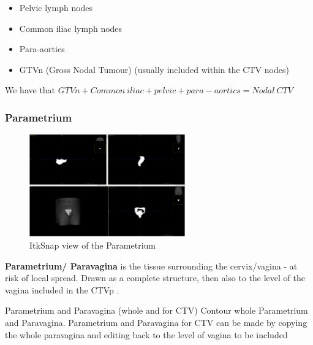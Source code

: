 \documentclass[11pt]{article}
\begin{document}
\begin{itemize}
    \item Pelvic lymph nodes
    \item Common iliac lymph nodes
    \item Para-aortics
    \item GTVn (Gross Nodal Tumour) (usually included within the CTV nodes)
\end{itemize}

We have that $GTVn + Common\ iliac + pelvic + para-aortics = Nodal\ CTV$

\subsubsection{Parametrium}

\begin{figure}[H]
    \centering
    \includegraphics[width=0.6\textwidth]{images/Parametrium.png}
    \caption{ItkSnap view of the Parametrium}\label{fig:CTVn}
\end{figure}

\textbf{Parametrium/ Paravagina} is the tissue surrounding the cervix/vagina - at risk of local spread. Drawn as a complete structure, then also to the level of the vagina included in the CTVp \cite{AMLART-data}.

Parametrium and Paravagina (whole and for CTV)  Contour whole Parametrium and Paravagina. Parametrium and Paravagina for CTV can be made by copying the whole paravagina and editing back to the level of vagina to be included

\printbibliography %
\end{document}
